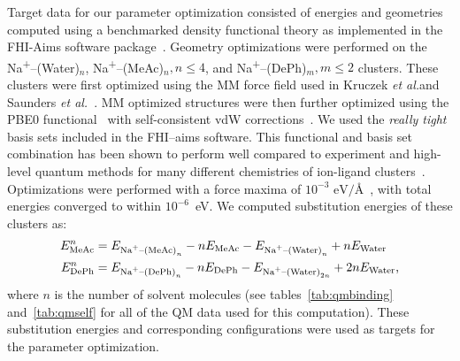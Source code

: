 \documentclass[12pt,openany,final]{book}
\newcommand{\etal}{\textit{et al.}}
\newcommand{\na}{Na\textsuperscript{+}}
\begin{document}
Target data for our parameter optimization consisted of energies and geometries 
computed using a benchmarked density functional theory as implemented in  
the FHI-Aims software package~\cite{fhiaims}. 
Geometry optimizations were performed on the \na--(Water)$_{n}$,
\na--(MeAc)$_{n}, n\leq4$, and \na--(DePh)$_m, m\leq2$ clusters.
These clusters were first optimized using the MM force field used in 
Kruczek \etal and Saunders \etal~\cite{kruczek:2017,saunders:2019}. 
MM optimized structures were then further
optimized using the PBE0 functional~\cite{perdew:1996:generalized,adamo:1999:toward} 
with self-consistent vdW corrections~\cite{tkatchenko:2009}. 
We used the \emph{really tight} basis sets included in the FHI--aims software. 
This functional and basis set combination 
has been shown to perform well compared to
experiment and high-level quantum methods for many different chemistries of ion-ligand clusters~\cite{wineman:2019,wineman:2020:transferable,wineman:2020:improved}. 
Optimizations were performed with a force 
maxima of $10^{-3}$ $\text{eV}/\text{\AA}$~, with total energies converged
to within $10^{-6}$~eV. 
We computed substitution energies of these clusters as:
\begin{equation}
    \begin{split}
        E^{n}_\text{MeAc}&=E_{\text{\na--(MeAc)}_n}-nE_\text{MeAc}-E_{\text{\na--(Water)}_n}+nE_\text{Water}\\ 
        E^{n}_\text{DePh}&=E_{\text{\na--(DePh)}_n}-nE_\text{DePh}-E_{\text{\na--(Water)}_{2n}}+2nE_\text{Water}\text{,}
    \end{split}
    \label{eq:substitution}
\end{equation}
where $n$ is the number of solvent molecules
(see tables~\ref{tab:qmbinding} and~\ref{tab:qmself} for all of the QM
data used for this computation).  These substitution energies and
corresponding configurations were used as targets for the parameter
optimization.
\end{document}
